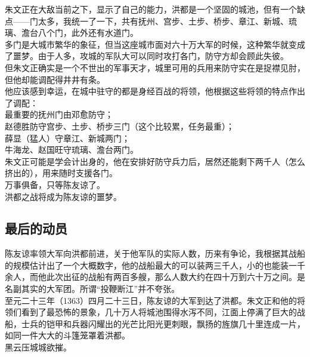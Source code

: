 \begin{multicols}{\theparacolNo}
朱文正在大敌当前之下，显示了自己的能力，洪都是一个坚固的城池，但有一个缺点——门太多，我统一了一下，共有抚州、宫步、土步、桥步、章江、新城、琉璃、澹台八个门，此外还有水道门。\\

多门是大城市繁华的象征，但当这座城市面对六十万大军的时候，这种繁华就变成了噩梦。由于人多，攻城的军队大可以同时攻打各门，防守方却会顾此失彼。\\

但朱文正确实是一个不世出的军事天才，城里可用的兵用来防守实在是捉襟见肘，但他却能调配得井井有条。\\

他应该感到幸运，在城中驻守的都是身经百战的将领，他根据这些将领的特点作出了调配：\\

最重要的抚州门由邓愈防守；\\

赵德胜防守宫步、土步、桥步三门（这个比较累，任务最重）；\\

薛显（猛人）守章江、新城两门；\\

牛海龙、赵国旺守琉璃、澹台两门。\\

朱文正可能是学会计出身的，他在安排好防守兵力后，居然还能剩下两千人（怎么挤出的），用来随时支援各门。\\

万事俱备，只等陈友谅了。\\

洪都之战将成为陈友谅的噩梦。\\

\subsection{最后的动员}
陈友谅率领大军向洪都前进，关于他军队的实际人数，历来有争论，我根据其战船的规模估计出了一个大概数字，他的战船最大的可以装两三千人，小的也能装一千余人，而他此次出征的战船有两百多艘，那么人数大约在四十万到六十万之间。是名副其实的大军团。所谓“投鞭断江”并不夸张。\\

至元二十三年（1363）四月二十三日，陈友谅的大军到达了洪都。朱文正和他的将领们看到了最恐怖的景象，几十万人将城池围得水泻不同，江面上停满了巨大的战船，士兵的铠甲和兵器闪耀出的光芒比阳光更刺眼，飘扬的旌旗几十里连成一片，如同一件大大的斗篷笼罩着洪都。\\

黑云压城城欲摧。\\


\end{multicols}
